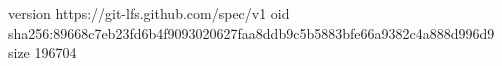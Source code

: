 version https://git-lfs.github.com/spec/v1
oid sha256:89668c7eb23fd6b4f9093020627faa8ddb9c5b5883bfe66a9382c4a888d996d9
size 196704
